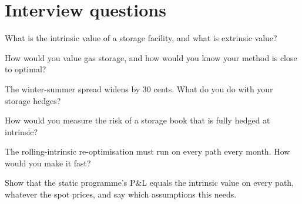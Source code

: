 \section{Interview questions}

\begin{interviewq}\label{iq:s2:storage-transport-and-physical-optionality:1}
What is the intrinsic value of a storage facility, and what is extrinsic value?
\end{interviewq}

\begin{interviewq}\label{iq:s2:storage-transport-and-physical-optionality:2}
How would you value gas storage, and how would you know your method is close to optimal?
\end{interviewq}

\begin{interviewq}\label{iq:s2:storage-transport-and-physical-optionality:3}
The winter-summer spread widens by 30 cents. What do you do with your storage hedges?
\end{interviewq}

\begin{interviewq}\label{iq:s2:storage-transport-and-physical-optionality:4}
How would you measure the risk of a storage book that is fully hedged at intrinsic?
\end{interviewq}

\begin{interviewq}\label{iq:s2:storage-transport-and-physical-optionality:5}
The rolling-intrinsic re-optimisation must run on every path every month. How would you make it fast?
\end{interviewq}

\begin{interviewq}\label{iq:s2:storage-transport-and-physical-optionality:6}
Show that the static programme's P\&L equals the intrinsic value on every path, whatever the spot prices, and say which assumptions this needs.
\end{interviewq}
